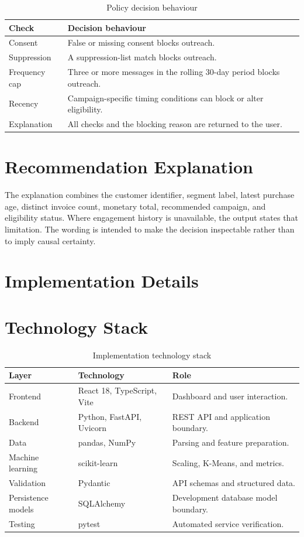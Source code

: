 \documentclass[12pt,a4paper]{report}
\begin{document}
\begin{table}[H]
\centering
\caption{Policy decision behaviour}\label{tab:policy}\small
\begin{tabular}{p{}p{}}
\toprule
Check & Decision behaviour\\\midrule
Consent & False or missing consent blocks outreach.\\
Suppression & A suppression-list match blocks outreach.\\
Frequency cap & Three or more messages in the rolling 30-day period blocks outreach.\\
Recency & Campaign-specific timing conditions can block or alter eligibility.\\
Explanation & All checks and the blocking reason are returned to the user.\\\bottomrule
\end{tabular}
\end{table}

\section{Recommendation Explanation}
The explanation combines the customer identifier, segment label, latest purchase age, distinct invoice count, monetary total, recommended campaign, and eligibility status. Where engagement history is unavailable, the output states that limitation. The wording is intended to make the decision inspectable rather than to imply causal certainty.

\section{Implementation Details}
\section{Technology Stack}
\begin{table}[H]
\centering
\caption{Implementation technology stack}\label{tab:stack}
\begin{tabular}{p{}p{}p{}}
\toprule
Layer & Technology & Role\\\midrule
Frontend & React 18, TypeScript, Vite & Dashboard and user interaction.\\
Backend & Python, FastAPI, Uvicorn & REST API and application boundary.\\
Data & pandas, NumPy & Parsing and feature preparation.\\
Machine learning & scikit-learn & Scaling, K-Means, and metrics.\\
Validation & Pydantic & API schemas and structured data.\\
Persistence models & SQLAlchemy & Development database model boundary.\\
Testing & pytest & Automated service verification.\\\bottomrule
\end{tabular}
\end{table}
\end{document}
